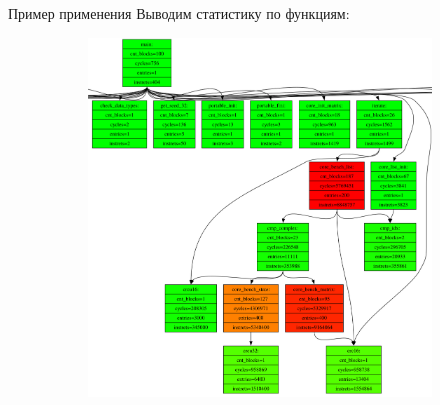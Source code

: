 \documentclass[10pt,aspectratio=169,hyperref={pdftex,unicode},xcolor=dvipsnames]{beamer}
\begin{document}
\begin{frame}{ Пример применения }
    Выводим статистику по функциям:
    \begin{figure}
        \begin{subfigure}{0.8\textwidth}
            \centering
            \includegraphics[height=0.8\textheight,keepaspectratio]{./images/stac_functions.png}
        \end{subfigure}
    \end{figure}

\end{frame}
\end{document}
